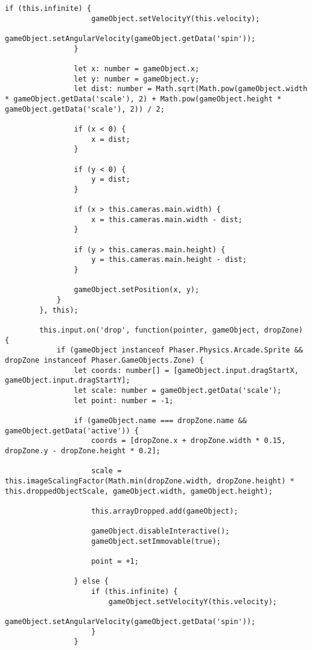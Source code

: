 \begin{lstlisting}[style=TypeScript, caption={propertySortingScene.ts}]
                if (this.infinite) {
                    gameObject.setVelocityY(this.velocity);
                    gameObject.setAngularVelocity(gameObject.getData('spin'));
                }

                let x: number = gameObject.x;
                let y: number = gameObject.y;
                let dist: number = Math.sqrt(Math.pow(gameObject.width * gameObject.getData('scale'), 2) + Math.pow(gameObject.height * gameObject.getData('scale'), 2)) / 2;

                if (x < 0) {
                    x = dist;
                }

                if (y < 0) {
                    y = dist;
                }

                if (x > this.cameras.main.width) {
                    x = this.cameras.main.width - dist;
                }

                if (y > this.cameras.main.height) {
                    y = this.cameras.main.height - dist;
                }

                gameObject.setPosition(x, y);
            }
        }, this);

        this.input.on('drop', function(pointer, gameObject, dropZone) {
            if (gameObject instanceof Phaser.Physics.Arcade.Sprite && dropZone instanceof Phaser.GameObjects.Zone) {
                let coords: number[] = [gameObject.input.dragStartX, gameObject.input.dragStartY];
                let scale: number = gameObject.getData('scale');
                let point: number = -1;

                if (gameObject.name === dropZone.name && gameObject.getData('active')) {
                    coords = [dropZone.x + dropZone.width * 0.15, dropZone.y - dropZone.height * 0.2];

                    scale = this.imageScalingFactor(Math.min(dropZone.width, dropZone.height) * this.droppedObjectScale, gameObject.width, gameObject.height);

                    this.arrayDropped.add(gameObject);

                    gameObject.disableInteractive();
                    gameObject.setImmovable(true);

                    point = +1;

                } else {
                    if (this.infinite) {
                        gameObject.setVelocityY(this.velocity);
                        gameObject.setAngularVelocity(gameObject.getData('spin'));
                    }
                }


\end{lstlisting}
